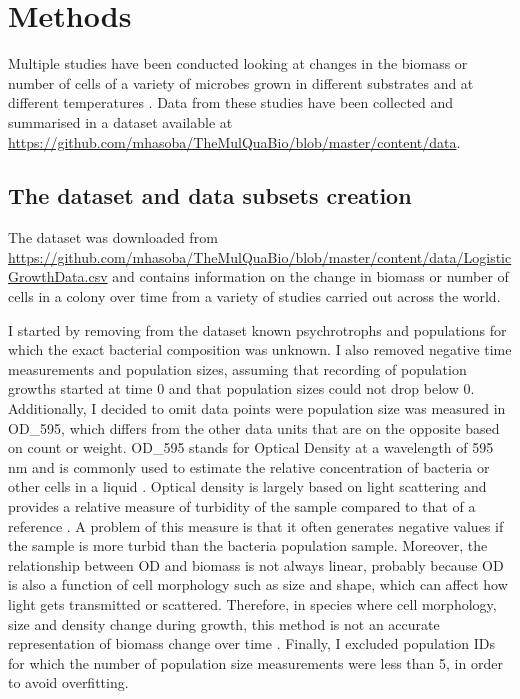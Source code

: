 \documentclass[a4paper]{article}
\begin{document}
\section{Methods}
Multiple studies have been conducted looking at changes in the biomass or number of cells of a variety of microbes grown in different substrates and at different temperatures \citep{bae2014growth,bernhardt2018metabolic,galarz2016predicting,gill1991growth,roth1962continuity,silva2018modelling,gill1991growth,sivonen1990effects,stannard1985temperature,zwietering1994modeling,PHILLIPS1987173}. Data from these studies have been collected and summarised in a dataset available at \url{https://github.com/mhasoba/TheMulQuaBio/blob/master/content/data}.

    \subsection{The dataset and data subsets creation}
    The dataset was downloaded from \url{https://github.com/mhasoba/TheMulQuaBio/blob/master/content/data/LogisticGrowthData.csv} and contains information on the change in biomass or number of cells in a colony over time from a variety of studies carried out across the world.
    
    I started by removing from the dataset known psychrotrophs and populations for which the exact bacterial composition was unknown. I also removed negative time measurements and population sizes, assuming that recording of population growths started at time 0 and that population sizes could not drop below 0. Additionally, I decided to omit data points were population size was measured in OD\_595, which differs from the other data units that are on the opposite based on count or weight. OD\_595 stands for Optical Density at a wavelength of 595 nm and is commonly used to estimate the relative concentration of bacteria or other cells in a liquid \citep{ParishJH1985BoBG}. Optical density is largely based on light scattering and provides a relative measure of turbidity of the sample compared to that of a reference \citep{ParishJH1985BoBG}. A problem of this measure is that it often generates negative values if the sample is more turbid than the bacteria population sample. Moreover, the relationship between OD and biomass is not always linear, probably because OD is also a function of cell morphology such as size and shape, which can affect how light gets transmitted or scattered. Therefore, in species where cell morphology, size and density change during growth, this method is not an accurate representation of biomass change over time \citep{10.1371/journal.pone.0097269}. Finally, I excluded population IDs for which the number of population size measurements were less than 5, in order to avoid overfitting. \par
    
\end{document}
